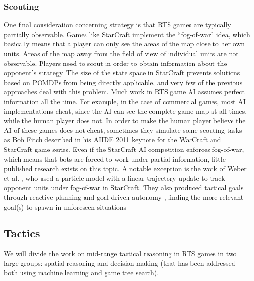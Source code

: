 \documentclass{llncs}
\begin{document}
\subsubsection*{Scouting}
One  final consideration  concerning strategy  is that  RTS games  are
typically  partially observable.  Games like  StarCraft implement  the
``fog-of-war'' idea, which basically means  that a player can only see
the areas  of the map close  to her own  units. Areas of the  map away
from the field of view of individual units are not observable. Players
need  to scout  in order  to obtain  information about  the opponent's
strategy. The size of the  state space in StarCraft prevents solutions
based on  POMDPs from being directly  applicable, and very few  of the
previous approaches deal  with this problem. Much work in  RTS game AI
assumes perfect information all the time.  For example, in the case of
commercial games, most AI implementations  cheat, since the AI can see
the  complete game  map  at all  times, while  the  human player  does
not. In order to  make the human player believe the  AI of these games
does not  cheat, sometimes  they simulate some  scouting tasks  as Bob
Fitch  described  in his  AIIDE  2011  keynote  for the  WarCraft  and
StarCraft game series.  Even if the StarCraft  AI competition enforces
fog-of-war, which  means that  bots are forced  to work  under partial
information, little published research exists on this topic. A notable
exception is the work of Weber  et al. \cite{WeberAIIDE11}, who used a
particle model with a linear trajectory update to track opponent units
under  fog-of-war  in StarCraft.  They  also  produced tactical  goals
through     reactive     planning     and     goal-driven     autonomy
\cite{WeberCig10,Weber10}, finding the more  relevant goal(s) to spawn
in unforeseen situations.


\subsection*{Tactics}

We will divide the work on mid-range tactical reasoning in RTS games in two
large groups: spatial reasoning and decision making (that has been addressed both using machine learning and game tree search).
\end{document}
